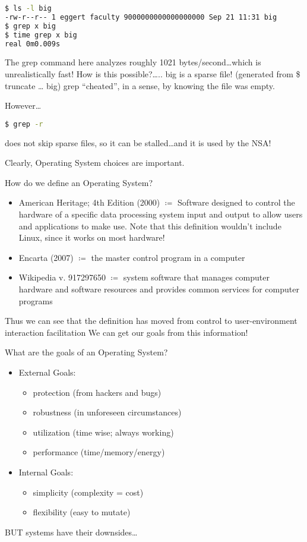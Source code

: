 \documentclass[../../lecture_notes.tex]{subfiles}
\begin{document}
\begin{lstlisting}[language=BASH]
$ ls -l big
-rw-r--r-- 1 eggert faculty 9000000000000000000 Sep 21 11:31 big
$ grep x big
$ time grep x big
real 0m0.009s
\end{lstlisting}

The grep command here analyzes roughly 1021 bytes/second…which is unrealistically fast!
How is this possible?….. big is a sparse file! (generated from \$ truncate … big)
grep “cheated”, in a sense, by knowing the file was empty.

However…
\begin{lstlisting}[language=BASH]
$ grep -r
\end{lstlisting}
does not skip sparse files, so it can be stalled…and it is used by the NSA!

Clearly, Operating System choices are important.

How do we define an Operating System?
\begin{itemize}
\item American Heritage; 4th Edition (2000) $\coloneqq$ Software designed to control the hardware of a specific data processing system input and output to allow users and applications to make use. Note that this definition wouldn’t include Linux, since it works on most hardware!
\item Encarta (2007) $\coloneqq$ the master control program in a computer
\item Wikipedia v. 917297650 $\coloneqq$ system software that manages computer hardware and software resources and provides common services for computer programs
\end{itemize}

Thus we can see that the definition has moved from control to user-environment interaction facilitation
We can get our goals from this information!

What are the goals of an Operating System?
\begin{itemize}
\item External Goals:
	\begin{itemize}
	\item protection (from hackers and bugs)
	\item robustness (in unforeseen circumstances)
	\item utilization (time wise; always working)
	\item performance (time/memory/energy)
	\end{itemize}
\item Internal Goals:
	\begin{itemize}
	\item simplicity (complexity = cost)
	\item flexibility (easy to mutate)
	\end{itemize}
\end{itemize}
BUT systems have their downsides…
\end{document}
